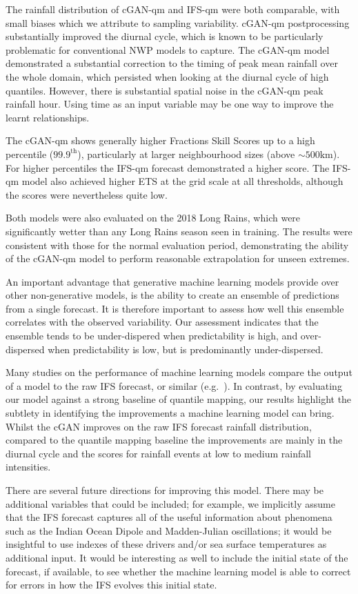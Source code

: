 \documentclass{article}
\begin{document}
The rainfall distribution of cGAN-qm and IFS-qm were both comparable, with small biases which we attribute to sampling variability. cGAN-qm postprocessing substantially improved the diurnal cycle, which is known to be particularly problematic for conventional NWP models to capture. The cGAN-qm model demonstrated a substantial correction to the timing of peak mean rainfall over the whole domain, which persisted when looking at the diurnal cycle of high quantiles. However, there is substantial spatial noise in the cGAN-qm peak rainfall hour. Using time as an input variable may be one way to improve the learnt relationships.

The cGAN-qm shows generally higher Fractions Skill Scores up to a high percentile ($99.9^{\text{th}}$), particularly at larger neighbourhood sizes (above $\sim500\text{km}$). For higher percentiles the IFS-qm forecast demonstrated a higher score. The IFS-qm model also achieved higher ETS at the grid scale at all thresholds, although the scores were nevertheless quite low.

Both models were also evaluated on the 2018 Long Rains, which were significantly wetter than any Long Rains season seen in training. The results were consistent with those for the normal evaluation period, demonstrating the ability of the cGAN-qm model to perform reasonable extrapolation for unseen extremes. 

An important advantage that generative machine learning models provide over other non-generative models, is the ability to create an ensemble of predictions from a single forecast. It is therefore important to assess how well this ensemble correlates with the observed variability. Our assessment indicates that the ensemble tends to be under-dispered when predictability is high, and over-dispersed when predictability is low, but is predominantly under-dispersed.

Many studies on the performance of machine learning models compare the output of a model to the raw IFS forecast, or similar (e.g.~\cite{bi_pangu-weather_2022}). In contrast, by evaluating our model against a strong baseline of quantile mapping, our results highlight the subtlety in identifying the improvements a machine learning model can bring. Whilst the cGAN improves on the raw IFS forecast rainfall distribution, compared to the quantile mapping baseline the improvements are mainly in the diurnal cycle and the scores for rainfall events at low to medium rainfall intensities.

There are several future directions for improving this model. There may be additional variables that could be included; for example, we implicitly assume that the IFS forecast captures all of the useful information about phenomena such as the Indian Ocean Dipole and Madden-Julian oscillations; it would be insightful to use indexes of these drivers and/or sea surface temperatures as additional input. It would be interesting as well to include the initial state of the forecast, if available, to see whether the machine learning model is able to correct for errors in how the IFS evolves this initial state.
\end{document}
